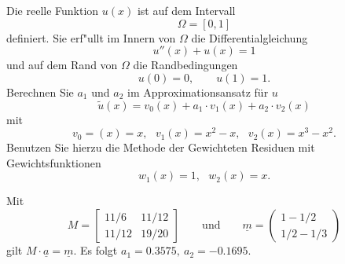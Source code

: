 Die reelle Funktion $u(x)$ ist auf dem Intervall
\[
\Omega = [0, 1]
\]
definiert. Sie erf"ullt im Innern von $\Omega$ die Differentialgleichung
\[
u''(x) + u(x) = 1
\]
und auf dem Rand von $\Omega$ die Randbedingungen
\[
u(0) = 0, \qquad
u(1) = 1.
\]
Berechnen Sie $a_1$ und $a_2$ im Approximationsansatz f\"ur $u$
\[
\tilde u(x) = v_0(x) + a_1 \cdot v_1(x) + a_2 \cdot v_2(x)
\]
mit
\[
v_0=(x) = x, \ \ \ v_1(x) = x^2 - x, \ \ \ v_2(x) = x^3 - x^2.
\]
Benutzen Sie hierzu die Methode der Gewichteten Residuen mit Gewichtsfunktionen
\[
w_1(x) = 1, \ \ \ w_2(x) = x.
\]


\begin{loesung}
Mit 
\[
M
=
\left[
\begin{matrix}
11/6 & 11/12 \\
11/12 & 19/20
\end{matrix}
\right]
\qquad\text{und}\qquad
\underline{m}
=
\begin{pmatrix}
1 - 1/2  \\ 1/2 - 1/3
\end{pmatrix}
\]
gilt $M \cdot \underline{a} = \underline{m}$.
Es folgt $a_1 = 0.3575, \ a_2 = -0.1695$.
\end{loesung}


